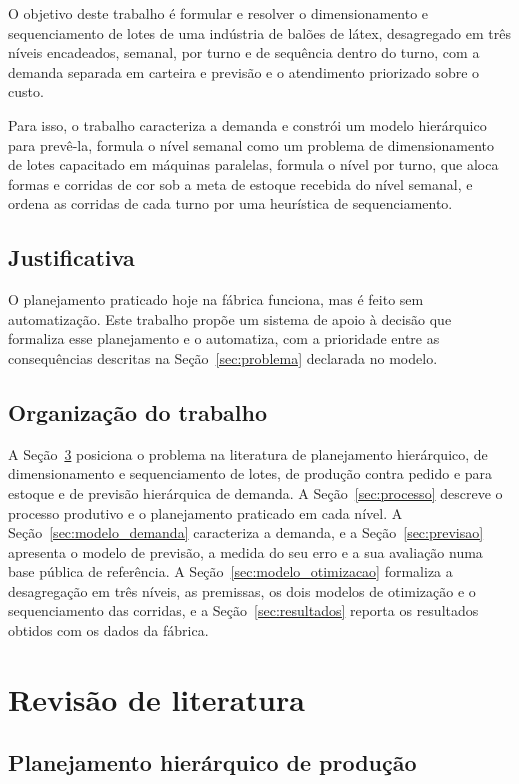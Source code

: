\documentclass[
    12pt,
    openright,
    oneside,
    a4paper,
    fleqn,
    chapter=TITLE,
    section=TITLE,
    english,
    brazil
]{abntex2}
\begin{document}
O objetivo deste trabalho é formular e resolver o dimensionamento e sequenciamento de lotes de uma indústria de balões de látex, desagregado em três níveis encadeados, semanal, por turno e de sequência dentro do turno, com a demanda separada em carteira e previsão e o atendimento priorizado sobre o custo.

Para isso, o trabalho caracteriza a demanda e constrói um modelo hierárquico para prevê-la, formula o nível semanal como um problema de dimensionamento de lotes capacitado em máquinas paralelas, formula o nível por turno, que aloca formas e corridas de cor sob a meta de estoque recebida do nível semanal, e ordena as corridas de cada turno por uma heurística de sequenciamento.

\section{Justificativa}

O planejamento praticado hoje na fábrica funciona, mas é feito sem automatização. Este trabalho propõe um sistema de apoio à decisão que formaliza esse planejamento e o automatiza, com a prioridade entre as consequências descritas na Seção~\ref{sec:problema} declarada no modelo.

\section{Organização do trabalho}

A Seção~\ref{sec:revisao} posiciona o problema na literatura de planejamento hierárquico, de dimensionamento e sequenciamento de lotes, de produção contra pedido e para estoque e de previsão hierárquica de demanda. A Seção~\ref{sec:processo} descreve o processo produtivo e o planejamento praticado em cada nível. A Seção~\ref{sec:modelo_demanda} caracteriza a demanda, e a Seção~\ref{sec:previsao} apresenta o modelo de previsão, a medida do seu erro e a sua avaliação numa base pública de referência. A Seção~\ref{sec:modelo_otimizacao} formaliza a desagregação em três níveis, as premissas, os dois modelos de otimização e o sequenciamento das corridas, e a Seção~\ref{sec:resultados} reporta os resultados obtidos com os dados da fábrica.


\chapter{Revisão de literatura}
\label{sec:revisao}

\section{Planejamento hierárquico de produção}
\label{sec:planejamento_hierarquico}
\end{document}
